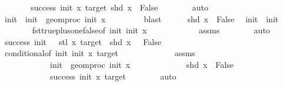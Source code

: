 \begin{isabellebody}
\ \ \ \ \isamarkupfalse%
\ \isamarkupfalse%
\ {\isachardoublequoteopen}success\ init\ x\ target{\isachardoublequoteclose}{\isachardoublequoteopen}\ shd\ x\ {\isacharequal}{\kern0pt}\ False{\isachardoublequoteclose}\isanewline
\ \ \ \ \ \ \isamarkupfalse%
\ auto\isanewline
\ \ \ \ \isamarkupfalse%
\ init{\isacharprime}{\kern0pt}\ \ {\isachardoublequoteopen}init{\isacharprime}{\kern0pt}\ {\isacharequal}{\kern0pt}\ geom{\isacharunderscore}{\kern0pt}proc\ init\ x\ {}{\isachardoublequoteclose}\isanewline
\ \ \ \ \ \ \isamarkupfalse%
\ blast\isanewline
\ \ \ \ \isamarkupfalse%
\ {\isacartoucheopen}shd\ x\ {\isacharequal}{\kern0pt}\ False{\isacartoucheclose}\ \isamarkupfalse%
\ {\isachardoublequoteopen}init{\isacharprime}{\kern0pt}\ {\isacharequal}{\kern0pt}\ init\ {\isacharminus}{\kern0pt}\ {}{\isachardoublequoteclose}\isanewline
\ \ \ \ \ \ \isamarkupfalse%
\ fst{\isacharunderscore}{\kern0pt}true{\isacharunderscore}{\kern0pt}plus{\isacharunderscore}{\kern0pt}one{\isacharunderscore}{\kern0pt}false{\isacharbrackleft}{\kern0pt}of\ init{\isacharprime}{\kern0pt}\ init\ x{\isacharbrackright}{\kern0pt}\isanewline
\ \ \ \ \ \ \ \ \ \ \ \ assms{\isacharparenleft}{\kern0pt}{}{\isacharparenright}{\kern0pt}\isanewline
\ \ \ \ \ \ \isamarkupfalse%
\ auto\isanewline
\ \ \ \ \isamarkupfalse%
\ \isamarkupfalse%
\ {\isachardoublequoteopen}success\ {\isacharparenleft}{\kern0pt}init\ {\isacharminus}{\kern0pt}\ {}{\isacharparenright}{\kern0pt}\ {\isacharparenleft}{\kern0pt}stl\ x{\isacharparenright}{\kern0pt}\ target\ {\isasymand}\ shd\ x\ {\isacharequal}{\kern0pt}\ \ False{\isachardoublequoteclose}\isanewline
\ \ \ \ \ \ \isamarkupfalse%
\ conditional{}{\isacharbrackleft}{\kern0pt}of\ init{\isacharprime}{\kern0pt}\ init\ x\ target{\isacharbrackright}{\kern0pt}\ \isanewline
\ \ \ \ \ \ \ \ \ \ \ \ assms\isanewline
\ \ \ \ \ \ \ \ \ \ \ \ {\isacartoucheopen}init{\isacharprime}{\kern0pt}\ {\isacharequal}{\kern0pt}\ geom{\isacharunderscore}{\kern0pt}proc\ init\ x\ {}{\isacartoucheclose}\isanewline
\ \ \ \ \ \ \ \ \ \ \ \ {\isacartoucheopen}shd\ x\ {\isacharequal}{\kern0pt}\ False{\isacartoucheclose}\isanewline
\ \ \ \ \ \ \ \ \ \ \ \ {\isacartoucheopen}success\ init\ x\ target{\isacartoucheclose}\isanewline
\ \ \ \ \ \ \isamarkupfalse%
\ auto\isanewline
\ \ \ \ \isamarkupfalse%

\end{isabellebody}

